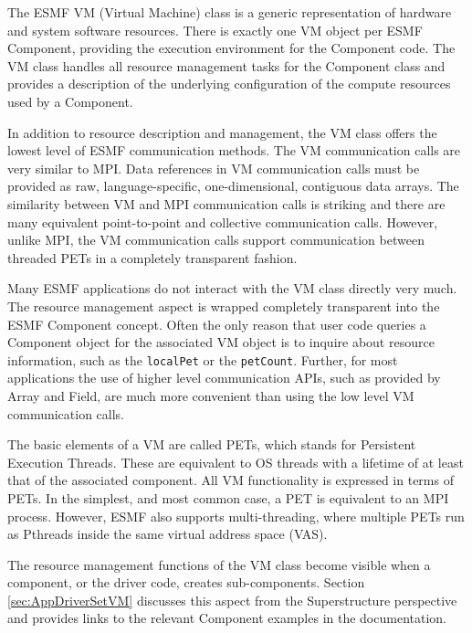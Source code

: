 %

The ESMF VM (Virtual Machine) class is a generic representation of hardware and system software resources. There is exactly one VM object per ESMF Component, providing the execution environment for the Component code. The VM class handles all resource management tasks for the Component class and provides a description of the underlying configuration of the compute resources used by a Component.

In addition to resource description and management, the VM class offers the lowest level of ESMF communication methods. The VM communication calls are very similar to MPI. Data references in VM communication calls must be provided as raw, language-specific, one-dimensional, contiguous data arrays. The similarity between VM and MPI communication calls is striking and there are many equivalent point-to-point and collective communication calls. However, unlike MPI, the VM communication calls support communication between threaded PETs in a completely transparent fashion.

Many ESMF applications do not interact with the VM class directly very much. The  resource management aspect is wrapped completely transparent into the ESMF Component concept. Often the only reason that user code queries a Component
object for the associated VM object is to inquire about resource information, such as the {\tt localPet} or the {\tt petCount}. Further, for most applications the use of higher level communication APIs, such as provided by Array and Field, are much more convenient than using the low level VM communication calls.

The basic elements of a VM are called PETs, which stands for Persistent Execution Threads. These are equivalent to OS threads with a lifetime of at least that of the associated component. All VM functionality is expressed in terms of PETs. In the simplest, and most common case, a PET is equivalent to an MPI process. However, ESMF also supports multi-threading, where multiple PETs run as Pthreads inside the same virtual address space (VAS).

The resource management functions of the VM class become visible when a component, or the driver code, creates sub-components. Section \ref{sec:AppDriverSetVM} discusses this aspect from the Superstructure 
perspective and provides links to the relevant Component examples in the documentation.


